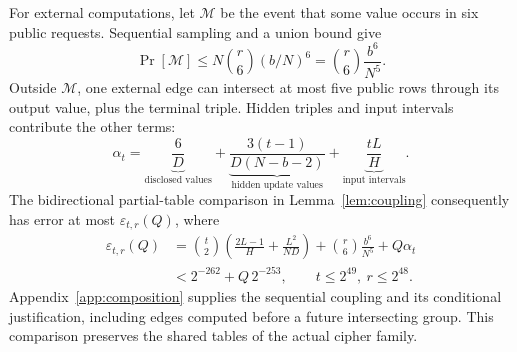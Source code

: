 \documentclass[journal=tosc,preprint,floatrow,nohyperxmp]{iacrtrans}
\newif\ifjordireview
\newcounter{jordinote}
\newcommand{\jordinote}[2]{%
  \ifjordireview
  \stepcounter{jordinote}\par\medskip\noindent
  \fcolorbox{blue!55!black}{blue!4}{%
    \begin{minipage}{\dimexpr\linewidth-2\fboxsep-2\fboxrule\relax}
    \small\raggedright\color{blue!45!black}
    \textbf{Solo Jordi -- J\thejordinote: #1}\par\smallskip
    #2
    \end{minipage}}\par\medskip
  \fi
}
\numberwithin{lemma}{section}
\numberwithin{proposition}{section}
\numberwithin{equation}{section}
\theoremstyle{definition}
\numberwithin{definition}{section}
\theoremstyle{plain}
\begin{document}
For external computations, let $\mathcal M$ be the event that some value occurs in six public requests. Sequential sampling and a union bound give
\begin{equation}
 \Pr[\mathcal M]\le N\binom r6(b/N)^6=\binom r6\frac{b^6}{N^5}.
 \label{eq:main-multiplicity}
\end{equation}
Outside $\mathcal M$, one external edge can intersect at most five public rows through its output value, plus the terminal triple. Hidden triples and input intervals contribute the other terms:
\begin{equation}
 \alpha_t=
 \underbrace{\frac6D}_{\text{disclosed values}}
 +\underbrace{\frac{3(t-1)}{D(N-b-2)}}_{\text{hidden update values}}
 +\underbrace{\frac{tL}{H}}_{\text{input intervals}}.
 \label{eq:main-alpha}
\end{equation}
The bidirectional partial-table comparison in Lemma~\ref{lem:coupling} consequently has error at most $\varepsilon_{t,r}(Q)$, where
\begin{align}
 \varepsilon_{t,r}(Q)
 &=\binom t2\left(\frac{2L-1}{H}+\frac{L^2}{ND}\right)
 +\binom r6\frac{b^6}{N^5}+Q\alpha_t\\
 &<2^{-262}+Q\,2^{-253},\qquad t\le2^{49},\ r\le2^{48}.
 \label{eq:numerics}
\end{align}
Appendix~\ref{app:composition} supplies the sequential coupling and its conditional justification, including edges computed before a future intersecting group. This comparison preserves the shared tables of the actual cipher family.

\jordinote{Qué aporta la composición completa}{Aquí se combinan los conflictos entre grupos, la multiplicidad pública y las computaciones externas. La finalidad es cubrir todo el intervalo de $2^{48}$ peticiones sin una restricción artificial a pocas solicitudes. Los verificadores comprueban las desigualdades numéricas exactas; tú debes revisar la cobertura de los eventos y el argumento de acoplamiento, que no quedan demostrados por esas cuentas automáticas.}
\end{document}
